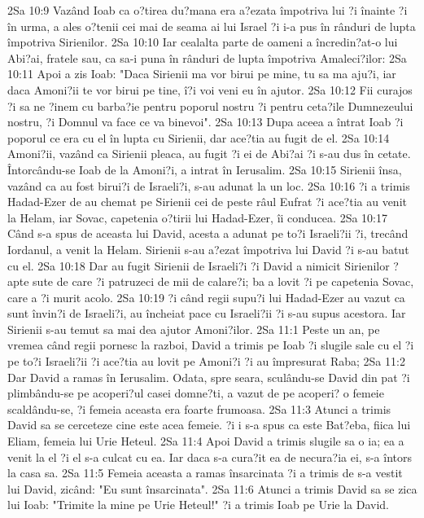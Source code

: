 2Sa 10:9  Vazând Ioab ca o?tirea du?mana era a?ezata împotriva lui ?i înainte ?i în urma, a ales o?tenii cei mai de seama ai lui Israel ?i i-a pus în rânduri de lupta împotriva Sirienilor.
2Sa 10:10  Iar cealalta parte de oameni a încredin?at-o lui Abi?ai, fratele sau, ca sa-i puna în rânduri de lupta împotriva Amaleci?ilor:
2Sa 10:11  Apoi a zis Ioab: "Daca Sirienii ma vor birui pe mine, tu sa ma aju?i, iar daca Amoni?ii te vor birui pe tine, î?i voi veni eu în ajutor.
2Sa 10:12  Fii curajos ?i sa ne ?inem cu barba?ie pentru poporul nostru ?i pentru ceta?ile Dumnezeului nostru, ?i Domnul va face ce va binevoi".
2Sa 10:13  Dupa aceea a întrat Ioab ?i poporul ce era cu el în lupta cu Sirienii, dar ace?tia au fugit de el.
2Sa 10:14  Amoni?ii, vazând ca Sirienii pleaca, au fugit ?i ei de Abi?ai ?i s-au dus în cetate. Întorcându-se Ioab de la Amoni?i, a intrat în Ierusalim.
2Sa 10:15  Sirienii însa, vazând ca au fost birui?i de Israeli?i, s-au adunat la un loc.
2Sa 10:16  ?i a trimis Hadad-Ezer de au chemat pe Sirienii cei de peste râul Eufrat ?i ace?tia au venit la Helam, iar Sovac, capetenia o?tirii lui Hadad-Ezer, îi conducea.
2Sa 10:17  Când s-a spus de aceasta lui David, acesta a adunat pe to?i Israeli?ii ?i, trecând Iordanul, a venit la Helam. Sirienii s-au a?ezat împotriva lui David ?i s-au batut cu el.
2Sa 10:18  Dar au fugit Sirienii de Israeli?i ?i David a nimicit Sirienilor ?apte sute de care ?i patruzeci de mii de calare?i; ba a lovit ?i pe capetenia Sovac, care a ?i murit acolo.
2Sa 10:19  ?i când regii supu?i lui Hadad-Ezer au vazut ca sunt învin?i de Israeli?i, au încheiat pace cu Israeli?ii ?i s-au supus acestora. Iar Sirienii s-au temut sa mai dea ajutor Amoni?ilor.
2Sa 11:1  Peste un an, pe vremea când regii pornesc la razboi, David a trimis pe Ioab ?i slugile sale cu el ?i pe to?i Israeli?ii ?i ace?tia au lovit pe Amoni?i ?i au împresurat Raba;
2Sa 11:2  Dar David a ramas în Ierusalim. Odata, spre seara, sculându-se David din pat ?i plimbându-se pe acoperi?ul casei domne?ti, a vazut de pe acoperi? o femeie scaldându-se, ?i femeia aceasta era foarte frumoasa.
2Sa 11:3  Atunci a trimis David sa se cerceteze cine este acea femeie. ?i i s-a spus ca este Bat?eba, fiica lui Eliam, femeia lui Urie Heteul.
2Sa 11:4  Apoi David a trimis slugile sa o ia; ea a venit la el ?i el s-a culcat cu ea. Iar daca s-a cura?it ea de necura?ia ei, s-a întors la casa sa.
2Sa 11:5  Femeia aceasta a ramas însarcinata ?i a trimis de s-a vestit lui David, zicând: "Eu sunt însarcinata".
2Sa 11:6  Atunci a trimis David sa se zica lui Ioab: "Trimite la mine pe Urie Heteul!" ?i a trimis Ioab pe Urie la David.
